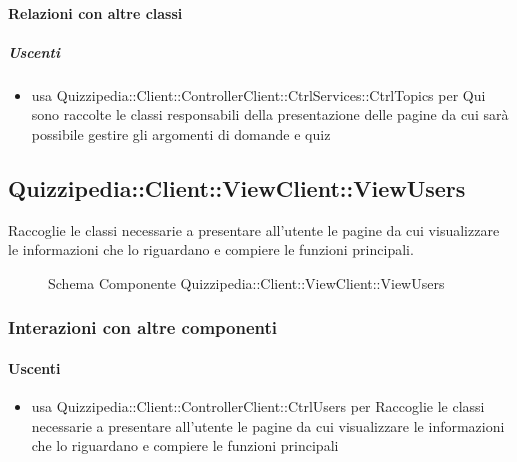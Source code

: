 \paragraph{Relazioni con altre classi}
\subparagraph{Uscenti}
\begin{itemize}
\item usa Quizzipedia::Client::ControllerClient::CtrlServices::CtrlTopics per Qui sono raccolte le classi responsabili della presentazione delle pagine da cui sarà possibile gestire gli argomenti di domande e quiz
\end{itemize}
\subsection{Quizzipedia::Client::ViewClient::ViewUsers}
Raccoglie le classi necessarie a presentare all'utente le pagine da cui visualizzare le informazioni che lo riguardano e compiere le funzioni principali.
\begin{figure}[H]
\centering
\noindent{}
\caption[Schema Componente Quizzipedia::Client::ViewClient::ViewUsers]{Schema Componente Quizzipedia::Client::ViewClient::ViewUsers}
\end{figure}
\subsubsection{Interazioni con altre componenti}
\paragraph{Uscenti}
\begin{itemize}
\item usa Quizzipedia::Client::ControllerClient::CtrlUsers per Raccoglie le classi necessarie a presentare all'utente le pagine da cui visualizzare le informazioni che lo riguardano e compiere le funzioni principali
\end{itemize}
